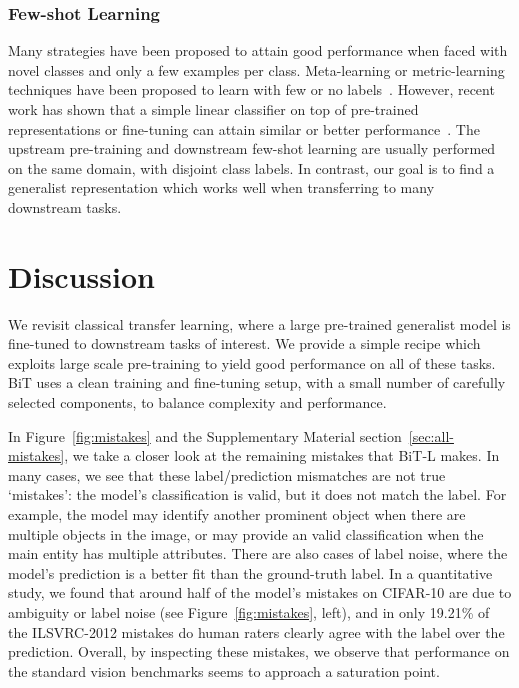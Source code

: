 \documentclass[runningheads]{llncs}
\newcommand{\name}{{BiT}}
\newcommand{\imagenet}{{ILSVRC-2012}}
\begin{document}
\vspace{-2mm}

\subsubsection{Few-shot Learning}
Many strategies have been proposed to attain good performance when faced with novel classes and only a few examples per class.
Meta-learning or metric-learning techniques have been proposed to learn with few or no labels~\cite{vinyals2016matching,snell2017prototypical,sung2018learning}.
However, recent work has shown that a simple linear classifier on top of pre-trained representations or fine-tuning can attain similar or better performance~\cite{chen2019closerlook,nakamura2019revisiting}.
The upstream pre-training and downstream few-shot learning are usually performed on the same domain, with disjoint class labels. 
In contrast, our goal is to find a generalist representation which works well when transferring to many downstream tasks.

\section{Discussion}

We revisit classical transfer learning, where a large pre-trained generalist model is fine-tuned to downstream tasks of interest.
We provide a simple recipe which exploits large scale pre-training to yield good performance on all of these tasks.
\name{} uses a clean training and fine-tuning setup, with a small number of carefully selected components, to balance complexity and performance.

In Figure~\ref{fig:mistakes} and the Supplementary Material section~\ref{sec:all-mistakes}, we take a closer look at the remaining mistakes that \name{}-L makes.
In many cases, we see that these label/prediction mismatches are not true `mistakes': the model's classification is valid, but it does not match the label.
For example, the model may identify another prominent object when there are multiple objects in the image, or may provide an valid classification when the main entity has multiple attributes.
There are also cases of label noise, where the model's prediction is a better fit than the ground-truth label.
In a quantitative study, we found that around half of the model's mistakes on CIFAR-10 are due to ambiguity or label noise (see Figure~\ref{fig:mistakes}, left), and in only 19.21\% of the \imagenet{} mistakes do human raters clearly agree with the label over the prediction.
Overall, by inspecting these mistakes, we observe that performance on the standard vision benchmarks seems to approach a saturation point. 
\end{document}
